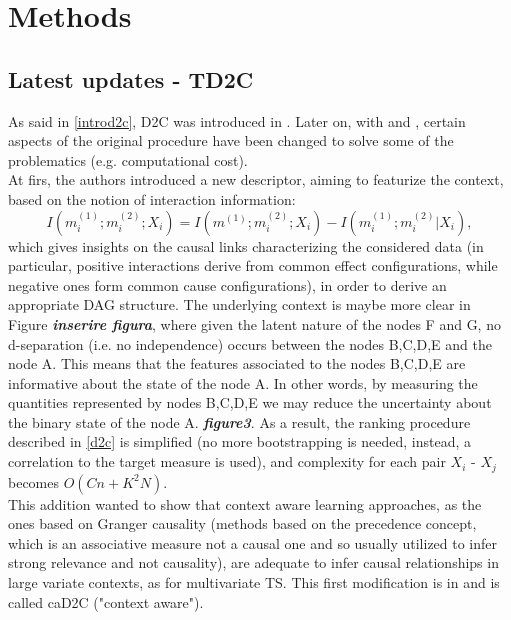 \chapter{Methods}
\section{Latest updates - TD2C}
As said in \ref{introd2c}, D2C was introduced in \cite{bontempi2015dependency}. Later on, with \cite{bontempi2020learning} and \textbf{\cite{TD2C paper}}, certain aspects of the original procedure have been changed to solve some of the problematics (e.g. computational cost). \\

At firs, the authors introduced a new descriptor, aiming to featurize the context, based on the notion of interaction information: $$I(m^{(1)}_i;m^{(2)}_i;X_i) = I(m^{(1)};m^{(2)}_i;X_i) - I(m^{(1)}_i;m^{(2)}_i|X_i),$$ which gives insights on the causal links characterizing the considered data (in particular, positive interactions derive from common effect configurations, while negative ones form common cause configurations), in order to derive an appropriate DAG structure. The underlying context is maybe more clear in Figure \textbf{\textit{inserire figura}}, where given the latent nature of the nodes F and G, no d-separation (i.e. no independence) occurs between the nodes B,C,D,E and the node A. This means that the features associated to the nodes B,C,D,E are informative about the state of the node A. In other words, by measuring the quantities represented by nodes B,C,D,E we may reduce the uncertainty about the binary state of the node A. \textbf{\textit{figure3}}. As a result, the ranking procedure described in \ref{d2c} is simplified (no more bootstrapping is needed, instead, a correlation to the target measure is used), and complexity for each pair $X_i$ - $X_j$ becomes $O(Cn + K^2N)$.\\
This addition wanted to show that context aware learning approaches, as the ones based on Granger causality (methods based on the precedence concept, which is an associative measure not a causal one and so usually utilized to infer strong relevance and not causality), are adequate to infer causal relationships in large variate contexts, as for multivariate TS. This first modification is in \cite{bontempi2020learning} and is called caD2C ("context aware").\\

